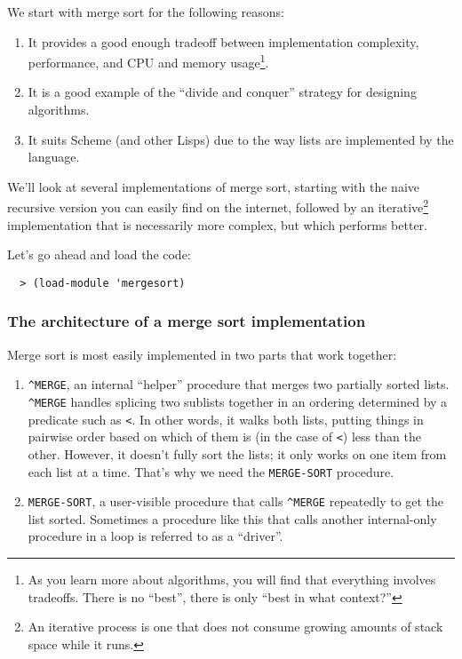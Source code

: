 \documentclass[12pt,openright,draft]{book}
\begin{document}
We start with merge sort for the following reasons:

\begin{enumerate}
\item It provides a good enough tradeoff between implementation
  complexity, performance, and CPU and memory usage\footnote{As you
    learn more about algorithms, you will find that everything
    involves tradeoffs.  There is no ``best'', there is only ``best in
    what context?''}.
\item It is a good example of the ``divide and conquer'' strategy for
  designing algorithms.
\item It suits Scheme (and other Lisps) due to the way lists are
  implemented by the language.
\end{enumerate}

We'll look at several implementations of merge sort, starting with the
naive recursive version you can easily find on the internet, followed
by an iterative\footnote{An iterative process is one that does not
  consume growing amounts of stack space while it runs.}
implementation that is necessarily more complex, but which performs
better.

Let's go ahead and load the code:

\begin{verbatim}
  > (load-module 'mergesort)
\end{verbatim}

\subsubsection{The architecture of a merge sort implementation}

Merge sort is most easily implemented in two parts that work together:

\begin{enumerate}

\item \verb|^MERGE|, an internal ``helper'' procedure that merges two
  partially sorted lists.  \verb|^MERGE| handles splicing two sublists
  together in an ordering determined by a predicate such as
  \verb|<|. In other words, it walks both lists, putting things in
  pairwise order based on which of them is (in the case of \verb|<|)
  less than the other.  However, it doesn't fully sort the lists; it
  only works on one item from each list at a time.  That's why we need
  the \verb|MERGE-SORT| procedure.

\item \verb|MERGE-SORT|, a user-visible procedure that calls
  \verb|^MERGE| repeatedly to get the list sorted.  Sometimes a
  procedure like this that calls another internal-only procedure in a
  loop is referred to as a ``driver''.

\end{enumerate}
\end{document}
